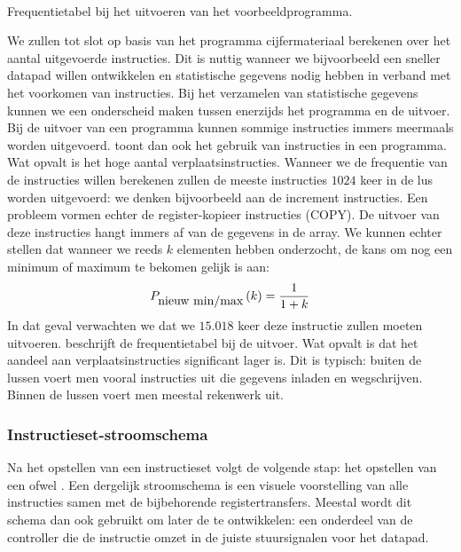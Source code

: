 \paragraph{}
\begin{table}[hbt]
\centering
{}
\caption{Frequentietabel bij het uitvoeren van het voorbeeldprogramma.}
\end{table}
We zullen tot slot op basis van het programma cijfermateriaal berekenen over het aantal uitgevoerde instructies. Dit is nuttig wanneer we bijvoorbeeld een sneller datapad willen ontwikkelen en statistische gegevens nodig hebben in verband met het voorkomen van instructies. Bij het verzamelen van statistische gegevens kunnen we een onderscheid maken tussen enerzijds het programma en de uitvoer. Bij de uitvoer van een programma kunnen sommige instructies immers meermaals worden uitgevoerd.  toont dan ook het gebruik van instructies in een programma. Wat opvalt is het hoge aantal verplaatsinstructies. Wanneer we de frequentie van de instructies willen berekenen zullen de meeste instructies $1024$ keer in de lus worden uitgevoerd: we denken bijvoorbeeld aan de increment instructies. Een probleem vormen echter de register-kopieer instructies (COPY). De uitvoer van deze instructies hangt immers af van de gegevens in de array. We kunnen echter stellen dat wanneer we reeds $k$ elementen hebben onderzocht, de kans om nog een minimum of maximum te bekomen gelijk is aan:
\begin{equation}
P_{\mbox{nieuw min/max}}\left( k \right)=\displaystyle\frac{1}{1+k}
\end{equation}
In dat geval verwachten we dat we $15.018$ keer deze instructie zullen moeten uitvoeren.  beschrijft de frequentietabel bij de uitvoer. Wat opvalt is dat het aandeel aan verplaatsinstructies significant lager is. Dit is typisch: buiten de lussen voert men vooral instructies uit die gegevens inladen en wegschrijven. Binnen de lussen voert men meestal rekenwerk uit.
\subsubsection{Instructieset-stroomschema}
Na het opstellen van een instructieset volgt de volgende stap: het opstellen van een  ofwel . Een dergelijk stroomschema is een visuele voorstelling van alle instructies samen met de bijbehorende registertransfers. Meestal wordt dit schema dan ook gebruikt om later de  te ontwikkelen: een onderdeel van de controller die de instructie omzet in de juiste stuursignalen voor het datapad.
